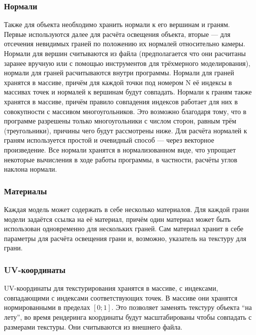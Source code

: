 \documentclass[a4paper,12pt]{report}
\begin{document}

\subsubsection{Нормали}
Также для объекта необходимо хранить нормали к его вершинам и граням. Первые используются далее для расчёта освещения объекта, вторые --- для отсечения невидимых граней по положению их нормалей относительно камеры. Нормали для вершин считываются из файла (предполагается что они расчитаны заранее вручную или с помощью инструментов для трёхмерного моделирования), нормали для граней расчитываются внутри программы. Нормали для граней хранятся в массиве, причём для каждой точки под номером N её индексы в массивах точек и нормалей к вершинам будут совпадать. Нормали к граням также хранятся в массиве, причём правило совпадения индексов работает для них в совокупности с массивом многоугольников. Это возможно благодаря тому, что в программе разрешены только многоугольники с числом сторон, равным трём (треугольники), причины чего будут рассмотрены ниже. Для расчёта нормалей к граням используется простой и очевидный способ --- через векторное произведение. Все нормали хранятся в нормализованном виде, что упрощает некоторые вычисления в ходе работы программы, в частности, расчёты углов наклона нормали.

\subsubsection{Материалы}
Каждая модель может содержать в себе несколько материалов. Для каждой грани модели задаётся ссылка на её материал, причём один материал может быть использован одновременно для нескольких граней. Сам материал хранит в себе параметры для расчёта освещения грани и, возможно, указатель на текстуру для грани.

\subsubsection{UV-координаты}
UV-координаты для текстурирования хранятся в массиве, с индексами, совпадающими с индексами соответствующих точек. В массиве они хранятся нормированными в пределах $[0;1]$. Это позволяет заменять текстуру объекта ``на лету'', во время рендеринга координаты будут масштабированы чтобы совпадать с размерами текстуры. Они считываются из внешнего файла.
\end{document}
